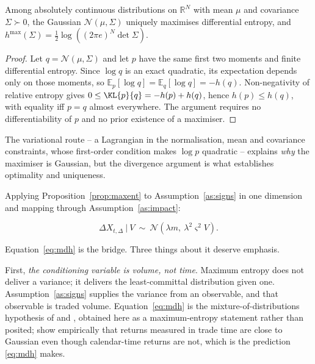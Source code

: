 \begin{proposition}
\label{prop:maxent}
Among absolutely continuous distributions on $\mathbb{R}^N$ with mean $\mu$ and
covariance $\Sigma\succ0$, the Gaussian $\mathcal N(\mu,\Sigma)$ uniquely
maximises differential entropy, and
$h^{\max}(\Sigma)=\tfrac12\log\left((2\pi e)^N\det\Sigma\right)$.
\end{proposition}

\begin{proof}
Let $q=\mathcal N(\mu,\Sigma)$ and let $p$ have the same first two moments and
finite differential entropy. Since $\log q$ is an exact quadratic, its
expectation depends only on those moments, so
$\mathbb{E}_p[\log q]=\mathbb{E}_q[\log q]=-h(q)$. Non-negativity of relative
entropy gives
$0\le \KL{p}{q} = -h(p)+h(q)$, hence $h(p)\le h(q)$, with equality iff $p=q$
almost everywhere. The argument requires no differentiability of $p$ and no
prior existence of a maximiser.
\end{proof}

The variational route -- a Lagrangian in the normalisation, mean and covariance
constraints, whose first-order condition makes $\log p$ quadratic -- explains
\emph{why} the maximiser is Gaussian, but the divergence argument is what
establishes optimality and uniqueness.

Applying Proposition~\ref{prop:maxent} to Assumption~\ref{as:signs} in one
dimension and mapping through Assumption~\ref{as:impact}:

\begin{equation}
\label{eq:mdh}
\Delta X_{t,\Delta}\ \big|\ V \ \sim\ \mathcal{N}\!\left(\lambda m,\ \lambda^2\varsigma^2 V\right).
\end{equation}

Equation~\eqref{eq:mdh} is the bridge. Three things about it deserve emphasis.

First, \emph{the conditioning variable is volume, not time}. Maximum entropy
does not deliver a variance; it delivers the least-committal distribution given
one. Assumption~\ref{as:signs} supplies the variance from an observable, and
that observable is traded volume. Equation~\eqref{eq:mdh} is the
mixture-of-distributions hypothesis of \citet{clark1973} and
\citet{tauchen1983}, obtained here as a maximum-entropy statement rather than
posited; \citet{ane2000} show empirically that returns measured in trade time
are close to Gaussian even though calendar-time returns are not, which is the
prediction \eqref{eq:mdh} makes.

